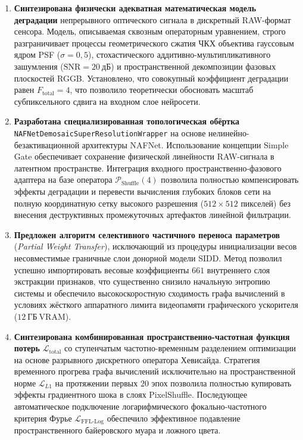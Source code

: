 \documentclass[12pt,a4paper]{article}
\begin{document}
\begin{enumerate}
    \item \textbf{Синтезирована физически адекватная математическая модель деградации} непрерывного оптического сигнала в дискретный RAW-формат сенсора. Модель, описываемая сквозным операторным уравнением, строго разграничивает процессы геометрического сжатия ЧКХ объектива гауссовым ядром PSF ($\sigma = 0{,}5$), стохастического аддитивно-мультипликативного зашумления ($\text{SNR} = 20~дБ$) и пространственной декомпозиции фазовых плоскостей RGGB. Установлено, что совокупный коэффициент деградации равен $F_{\operatorname{total}} = 4$, что позволило теоретически обосновать масштаб субпиксельного сдвига на входном слое нейросети.
    
    \item \textbf{Разработана специализированная топологическая обёртка} \texttt{NAFNetDemosaicSuperResolutionWrapper} на основе нелинейно-безактивационной архитектуры NAFNet. Использование концепции Simple Gate обеспечивает сохранение физической линейности RAW-сигнала в латентном пространстве. Интеграция входного пространственно-фазового адаптера на базе оператора $\mathcal{P}_{\operatorname{Shuffle}}(4)$ позволила полностью компенсировать эффекты деградации и перевести вычисления глубоких блоков сети на полную координатную сетку высокого разрешения ($512 \times 512$ пикселей) без внесения деструктивных промежуточных артефактов линейной фильтрации.
    
    \item \textbf{Предложен алгоритм селективного частичного переноса параметров} (\textit{Partial Weight Transfer}), исключающий из процедуры инициализации весов несовместимые граничные слои донорной модели SIDD. Метод позволил успешно импортировать весовые коэффициенты $661$ внутреннего слоя экстракции признаков, что существенно снизило начальную энтропию системы и обеспечило высокоскоростную сходимость графа вычислений в условиях жёсткого аппаратного лимита видеопамяти графического ускорителя ($12~\text{ГБ}~\text{VRAM}$).
    
    \item \textbf{Синтезирована комбинированная пространственно-частотная функция потерь} $\mathcal{L}_{\operatorname{total}}$ со ступенчатым частотно-временным разделением оптимизации на основе разрывного дискретного оператора Хевисайда. Стратегия временного прогрева графа вычислений исключительно на пространственной норме $\mathcal{L}_{L1}$ на протяжении первых $20$ эпох позволила полностью купировать эффекты градиентного шока в слоях PixelShuffle. Последующее автоматическое подключение логарифмического фокально-частотного критерия Фурье $\mathcal{L}_{\operatorname{FFL-Log}}$ обеспечило эффективное подавление пространственного байеровского муара и ложного цвета.
    

\end{enumerate}
\end{document}
